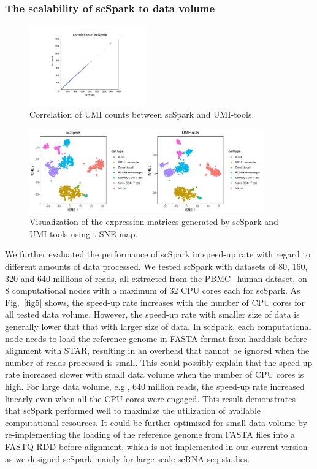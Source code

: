 \documentclass[conference]{IEEEtran}
\begin{document}
\subsubsection{The scalability of scSpark to data volume}
\begin{figure}
	\centering
	\includegraphics[width=0.45\textwidth]{fig6.pdf}
	\caption{Correlation of UMI counts between scSpark and UMI-tools.} \label{fig6}
\end{figure}
\begin{figure}
	\centering
	\includegraphics[width=0.9\textwidth]{fig7.pdf}
	\caption{Visualization of the expression matrices generated by scSpark and UMI-tools using t-SNE map.} \label{fig7}
\end{figure}

We further evaluated the performance of scSpark in speed-up rate with regard to different amounts of data processed.  
We tested scSpark with datasets of 80, 160, 320 and 640 millions of reads, all extracted from the PBMC\_human dataset, on 8 computational nodes with a maximum of 32 CPU cores each for scSpark. 
As Fig.~\ref{fig5} shows, the speed-up rate increases with the number of CPU cores for all tested data volume. 
However, the speed-up rate with smaller size of data is generally lower that that with larger size of data. 
In scSpark, each computational node needs to load the reference genome in FASTA format from harddisk before alignment with STAR, resulting in an overhead that cannot be ignored when the number of reads processed is small. 
This could possibly explain that the speed-up rate increased slower with small data volume when the number of CPU cores is high.  
For large data volume, e.g., 640 million reads, the speed-up rate increased linearly even when all the CPU cores were engaged.  
This result demonstrates that scSpark performed well to maximize the utilization of available computational resources. It could be further optimized for small data volume by re-implementing the loading of the reference genome from FASTA files into a FASTQ RDD before alignment, which is not implemented in our current version as we designed scSpark mainly for large-scale scRNA-seq studies. 
\end{document}
